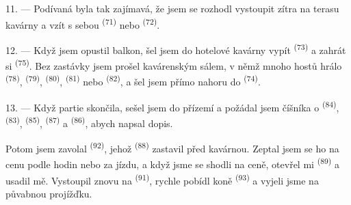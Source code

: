 \VUsaut{3.0mm}
\VUsaut{3.0mm}

11. --- Podívaná byla tak zajímavá, že jsem se rozhodl vystoupit zítra na terasu kavárny a
vzít s sebou  \textsuperscript{(71)} nebo
 \textsuperscript{(72)}.

12. --- Když jsem opustil balkon, šel jsem do hotelové kavárny vypít 
\textsuperscript{(73)} a zahrát si  \textsuperscript{(75)}. Bez
zastávky jsem prošel kavárenským sálem, v němž mnoho hostů hrálo 
\textsuperscript{(78)},  \textsuperscript{(79)}, 
\textsuperscript{(80)},  \textsuperscript{(81)} nebo 
\textsuperscript{(82)}, a šel jsem přímo nahoru do 
\textsuperscript{(74)}.

13. --- Když partie skončila, sešel jsem do přízemí a požádal jsem číšníka o
 \textsuperscript{(84)},  \textsuperscript{(83)},
 \textsuperscript{(85)}, 
\textsuperscript{(87)} a  \textsuperscript{(86)}, abych napsal dopis.

Potom jsem zavolal  \textsuperscript{(92)}, jehož 
\textsuperscript{(88)} zastavil před kavárnou. Zeptal jsem se ho na cenu podle hodin nebo za
jízdu, a když jsme se shodli na ceně, otevřel mi  \textsuperscript{(89)} a
usadil mě. Vystoupil znovu na  \textsuperscript{(91)}, rychle pobídl koně
 \textsuperscript{(93)} a vyjeli jsme na půvabnou projížďku.
